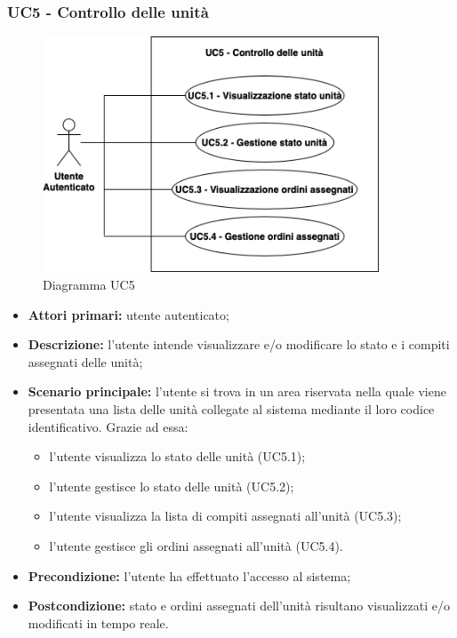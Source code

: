 \subsubsection{UC5 - Controllo delle unità}
\begin{figure}[h!]
    \centering
    \includegraphics[width=10cm]{images/uc5.png}
    \caption{Diagramma UC5}
\end{figure}
\begin{itemize}
    \item \textbf{Attori primari:} utente autenticato;
    \item \textbf{Descrizione:} l'utente intende visualizzare e/o modificare lo stato e i compiti assegnati delle unità;
    \item \textbf{Scenario principale:} l'utente si trova in un area riservata nella quale viene presentata una lista delle unità collegate al sistema mediante il loro codice identificativo. Grazie ad essa:
    \begin{itemize}
        \item l'utente visualizza lo stato delle unità (UC5.1);
        \item l'utente gestisce lo stato delle unità (UC5.2);
        \item l'utente visualizza la lista di compiti assegnati all'unità (UC5.3);
        \item l'utente gestisce gli ordini assegnati all'unità (UC5.4).
    \end{itemize}
    \item \textbf{Precondizione:} l'utente ha effettuato l'accesso al sistema;
    \item \textbf{Postcondizione:} stato e ordini assegnati dell'unità risultano visualizzati e/o modificati in tempo reale.
\end{itemize}

